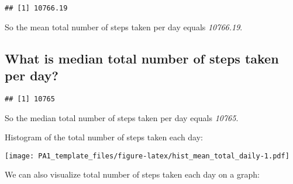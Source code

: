\documentclass[
]{article}
\newenvironment{Shaded}{\begin{snugshade}}{\end{snugshade}}
\newcommand{\AttributeTok}[1]{\textcolor[rgb]{0.13,0.29,0.53}{#1}}
\newcommand{\ConstantTok}[1]{\textcolor[rgb]{0.56,0.35,0.01}{#1}}
\newcommand{\FunctionTok}[1]{\textcolor[rgb]{0.13,0.29,0.53}{\textbf{#1}}}
\newcommand{\NormalTok}[1]{#1}
\newcommand{\SpecialCharTok}[1]{\textcolor[rgb]{0.81,0.36,0.00}{\textbf{#1}}}
\newcommand{\StringTok}[1]{\textcolor[rgb]{0.31,0.60,0.02}{#1}}
\begin{document}
\begin{verbatim}
## [1] 10766.19
\end{verbatim}

So the mean total number of steps taken per day equals \emph{10766.19}.

\subsection{What is median total number of steps taken per
day?}\label{what-is-median-total-number-of-steps-taken-per-day}

\begin{Shaded}
\end{Shaded}

\begin{verbatim}
## [1] 10765
\end{verbatim}

So the median total number of steps taken per day equals \emph{10765}.

Histogram of the total number of steps taken each day:

\begin{Shaded}
\end{Shaded}

\texttt{[image: PA1\_template\_files/figure-latex/hist\_mean\_total\_daily-1.pdf]}

We can also visualize total number of steps taken each day on a graph:

\begin{Shaded}
\end{Shaded}
\end{document}
